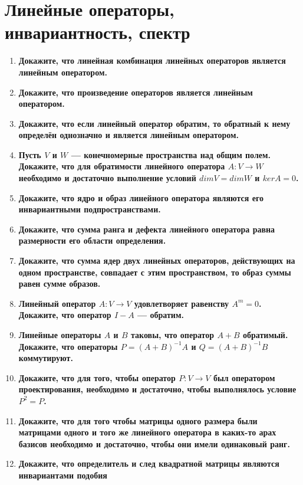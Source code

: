 \documentclass[12pt]{article} %
\begin{document}


\tableofcontents

\section{Линейные операторы, инвариантность, спектр}

\begin{enumerate}
    \item \textbf{Докажите, что линейная комбинация линейных операторов является линейным оператором.}
    \item \textbf{Докажите, что произведение операторов является линейным оператором.}
    \item \textbf{Докажите, что если линейный оператор обратим, то обратный к нему определён однозначно и является линейным оператором.}
    \item \textbf{Пусть $V$ и $W$ --- конечномерные пространства над общим полем. Докажите, что для обратимости линейного оператора $A: V \rightarrow W$ необходимо и достаточно выполнение условий $dimV = dimW$ и $kerA = 0$.}
    \item \textbf{Докажите, что ядро и образ линейного оператора являются его инвариантными подпространствами.}
    \item \textbf{Докажите, что сумма ранга и дефекта линейного оператора равна размерности его области определения.}
    \item \textbf{Докажите, что сумма ядер двух линейных операторов, действующих на одном пространстве, совпадает с этим пространством, то образ суммы равен сумме образов.}
    \item \textbf{Линейный оператор $A: V \rightarrow V$ удовлетворяет равенству $A^m = 0$. Докажите, что оператор $I - A$ --- обратим.}
    \item \textbf{Линейные операторы $A$ и $B$ таковы, что оператор $A + B$ обратимый. Докажите, что операторы $P = (A + B)^{-1}A$ и $Q = (A + B)^{-1}B$ коммутируют.}
    \item \textbf{Докажите, что для того, чтобы оператор $P: V \rightarrow V$ был оператором проектирования, необходимо и достаточно, чтобы выполнялось условие $P^2 = P$.}
    \item \textbf{Докажите, что для того чтобы матрицы одного размера были матрицами одного и того же линейного оператора в каких-то арах базисов необходимо и достаточно, чтобы они имели одинаковый ранг.}
    \item \textbf{Докажите, что определитель и след квадратной матрицы являются инвариантами подобия}

\end{enumerate}
\end{document}

